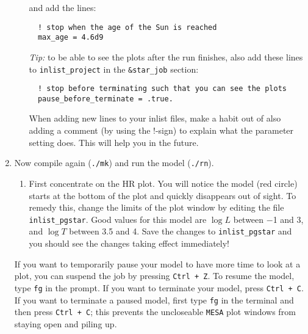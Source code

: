 \documentclass[11pt,a4paper]{article}
\begin{document}
\begin{enumerate}
\begin{enumerate}
  and add the lines:
  \begin{lstlisting}
  ! stop when the age of the Sun is reached
  max_age = 4.6d9
  \end{lstlisting}

  \textit{Tip:} to be able to see the plots after the run finishes, also add these lines to \verb|inlist_project| in the \verb|&star_job| section:
  \begin{lstlisting}
  ! stop before terminating such that you can see the plots
  pause_before_terminate = .true.
  \end{lstlisting}
  When adding new lines to your inlist files, make a habit out of also adding a comment (by using the !-sign) to explain what the parameter setting does. This will help you in the future.

\end{enumerate}



\item Now compile again (\verb|./mk|) and run the model (\verb|./rn|). 
\begin{enumerate}
  \item First concentrate on the HR plot. You will notice the model (red circle) starts at the bottom of the plot and quickly disappears out of sight. 
  To remedy this, change the limits of the plot window by editing the file \verb|inlist_pgstar|. Good values for this model are $\log L$ between $-$1 and 3, and $\log T$ between 3.5 and 4. Save the changes to \verb|inlist_pgstar| and you should see the changes taking effect immediately!

\end{enumerate}


\begin{tcolorbox}[protipbox]
If you want to temporarily pause your model to have more time to look at a plot, you can suspend the job by pressing \texttt{Ctrl + Z}. To resume the model, type \texttt{fg} in the prompt. If you want to terminate your model, press \texttt{Ctrl + C}. If you want to terminate a paused model, first type \texttt{fg} in the terminal and then press \texttt{Ctrl + C}; this prevents the uncloseable \texttt{MESA} plot windows from staying open and piling up. 
\end{tcolorbox}


\begin{enumerate}[start=2]


\end{enumerate}
\end{enumerate}
\end{document}
